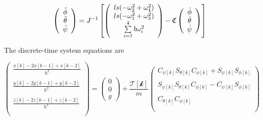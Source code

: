 \begin{equation}
    \left(
        \begin{array}{c}
           \ddot{\phi}\\
           \ddot{\theta}\\
           \ddot{\psi}\\
        \end{array}
    \right) = J^{-1}
    \left[ \left(
        \begin{array}{c}
            l s (-\omega_2^2 + \omega_4^2)\\
            l s (-\omega_1^2 + \omega_3^2)\\
            \sum \limits_{i=1}^4 b \omega_i^2\\
        \end{array}
    \right) -
    \mathfrak{C}
    \left(
        \begin{array}{c}
           \dot{\phi}\\
           \dot{\theta}\\
           \dot{\psi}\\
        \end{array}
    \right)
    \right]
\end{equation}

The discrete-time system equations are

\begin{equation}
    \left(
        \begin{array}{c}
           \frac{x[k] -2 x[k-1] + x[k-2]}{h^2} \\\\
           \frac{y[k] -2 y[k-1] + y[k-2]}{h^2} \\\\
           \frac{z[k] -2 z[k-1] + z[k-2]}{h^2}\\\\
        \end{array}
    \right)
    = \left(
       \begin{array}{c}
        0\\
        0\\
        g
      \end{array}
    \right)
    +\frac{\mathcal{T[k]}}{m}
     \left(
        \begin{array}{c}
             C_{\psi[k]}S_{\theta[k]}C_{\phi[k]} + S_{\psi[k]}S_{\phi[k]} \\\\
             S_{\psi[k]}S_{\theta[k]}C_{\phi[k]} - C_{\psi[k]}S_{\phi[k]} \\\\
             C_{\theta[k]} C_{\phi[k]} \\\\
        \end{array}
    \right)
\end{equation}


